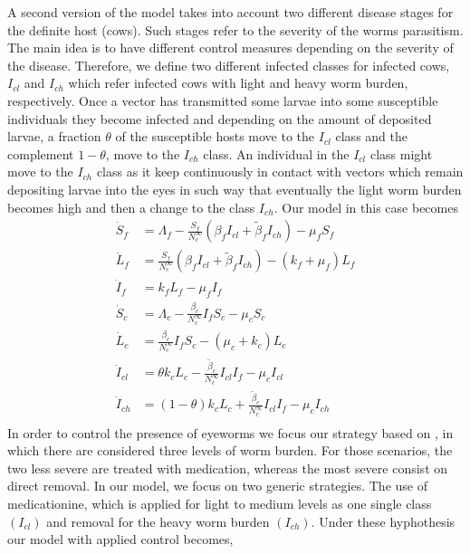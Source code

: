 \documentclass[preprint, 12pt]{elsarticle}
\begin{document}
\noindent A second version of the model takes into account two different disease stages for the definite host (cows). Such stages refer to the severity of the worms parasitism. The main idea is to have different control measures depending on the severity of the disease. Therefore, we define two
different infected classes for infected cows, $I_{cl}$ and $I_{ch}$ which refer infected cows with light and heavy worm burden, respectively. Once a vector has transmitted some larvae into some susceptible individuals they become infected and depending on the amount of deposited larvae, a fraction $\theta$ of the susceptible hosts move to the $I_{cl}$ class and the complement $1-\theta$, move to the $I_{ch}$ class. An individual in the $I_{cl}$ class might move to the $I_{ch}$ class as it keep continuously in contact with vectors which remain depositing larvae into the eyes in such way that eventually the light worm burden becomes high and then a change to the class $I_{ch}$. Our model in this case becomes
\begin{equation}\label{Eq:SIvectorhostmodel_v2}
\begin{aligned}
    \dot{S}_f&=
        \Lambda_f-\frac{S_f}{N_c^{\infty}}\left(\beta_fI_{cl}+\tilde{\beta}_fI_{ch} \right)-\mu_fS_f
    \\
    \dot{L}_f&=
        \frac{S_f}{N_c^{\infty}}\left(\beta_fI_{cl}+\tilde{\beta}_fI_{ch}\right)-\left(k_f+\mu_f\right)L_f
    \\
    \dot{I}_f&=
        k_f L_f-\mu_fI_f
    \\
    \dot{S}_c&=
        \Lambda_c-\frac{\beta_c}{N_c^{\infty}}I_fS_c-\mu_cS_c
    \\
    \dot{L}_c&=
        \frac{\beta_c}{N_c^{\infty}}I_fS_c-\left(\mu_c+k_c\right)L_c
    \\
    \dot{I}_{cl}&=  \theta k_c L_c- \frac{\tilde{\beta}_c}{N_c^{\infty}}I_{cl}I_f-\mu_c I_{cl}
    \\
    \dot{I}_{ch}&= (1-\theta) k_c L_c + \frac{\tilde{\beta}_c}{N_c^{\infty}}I_{cl}I_f- \mu_c I_{ch}
    \\
\end{aligned}
\end{equation}
\noindent In order to control the presence of eyeworms we focus our strategy based on \cite{Manjunath:2016}, in which there are considered three levels of worm burden. For those scenarios, the two less severe are treated with medication, whereas the most severe consist on direct removal. In our model, we focus on two generic strategies. The use of medicationine, which is applied for light to medium levels as one single class $(I_{cl})$ and removal for the heavy worm burden $(I_{ch})$. Under these hyphothesis our model with applied control becomes,
\end{document}
